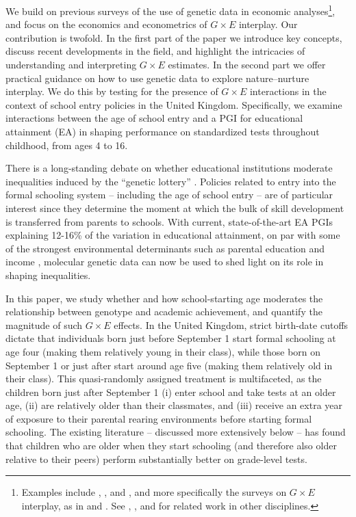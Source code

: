 \documentclass[12pt,a4paper]{article}
\begin{document}
\begin{bibunit}
We build on previous surveys of the use of genetic data in economic analyses\footnote{Examples include \citet{Benjamin2011}, \citet{Beauchamp2011}, and \citet{benjamin2024social}, and more specifically the surveys on $G \times E$ interplay, as in \citet{Fletcher2013} and \citet{Schmitz2017}. See \cite{Rutter2006}, \citet{Plomin2014}, \citet{Mills2020book} and \citet{domingue2020interactions} for related work in other disciplines.}, and focus on the economics and econometrics of $G \times E$ interplay. Our contribution is twofold. In the first part of the paper we introduce key concepts, discuss recent developments in the field, and highlight the intricacies of understanding and interpreting $G \times E$ estimates. In the second part we offer practical guidance on how to use genetic data to explore nature--nurture interplay. We do this by testing for the presence of $G \times E$ interactions in the context of school entry policies in the United Kingdom. Specifically, we examine interactions between the age of school entry and a PGI for educational attainment (EA) in shaping performance on standardized tests throughout childhood, from ages 4 to 16. 

There is a long-standing debate \citep{heath1985education} on whether educational institutions moderate inequalities induced by the ``genetic lottery'' \citep{harden2021genetic}. 
Policies related to entry into the formal schooling system -- including the age of school entry -- are of particular interest since they determine the moment at which the bulk of skill development is transferred from parents to schools. 
With current, state-of-the-art EA PGIs explaining 12-16\% of the variation in educational attainment, on par with some of the strongest environmental determinants such as parental education and income \citep{lee2018gene, Okbay2022}, molecular genetic data can now be used to shed light on its role in shaping inequalities. 

In this paper, we study whether and how school-starting age moderates the relationship between genotype and academic achievement, and quantify the magnitude of such $G \times E$ effects. In the United Kingdom, strict birth-date cutoffs dictate that individuals born just before September 1 start formal schooling at age four (making them relatively young in their class), while those born on September 1 or just after start around age five (making them relatively old in their class).  This quasi-randomly assigned treatment is multifaceted, as the children born just after September 1 (i) enter school and take tests at an older age, (ii) are relatively older than their classmates, and (iii) receive an extra year of exposure to their parental rearing environments before starting formal schooling.  The existing literature -- discussed more extensively below -- has found that children who are older when they start schooling (and therefore also older relative to their peers) perform substantially better on grade-level tests.  


\end{bibunit}
\end{document}
